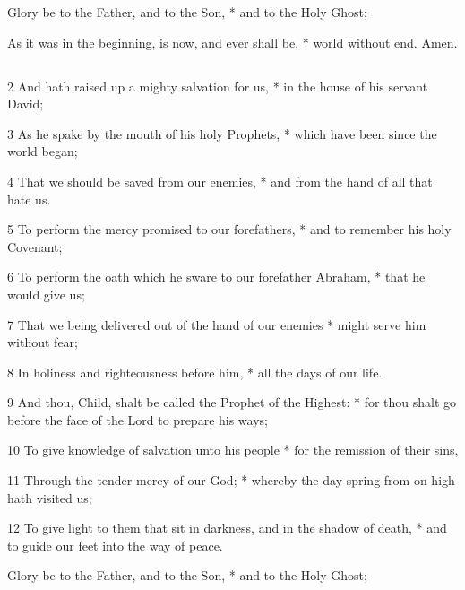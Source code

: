 Glory be to the Father, and to the Son, * and to the Holy Ghost;

As it was in the beginning, is now, and ever shall be, * world without end. Amen.

\subsubsection{}


\subsection{}


2 And hath raised up a mighty salvation for us, * in the house of his servant David;

3 As he spake by the mouth of his holy Prophets, * which have been since the world began;

4 That we should be saved from our enemies, * and from the hand of all that hate us.

5 To perform the mercy promised to our forefathers, * and to remember his holy Covenant;

6 To perform the oath which he sware to our forefather Abraham, * that he would give us;

7 That we being delivered out of the hand of our enemies * might serve him without fear;

8 In holiness and righteousness before him, * all the days of our life.

9 And thou, Child, shalt be called the Prophet of the Highest: * for thou shalt go before the face of the Lord to prepare his ways;

10 To give knowledge of salvation unto his people * for the remission of their sins,

11 Through the tender mercy of our God; * whereby the day-spring from on high hath visited us;

12 To give light to them that sit in darkness, and in the shadow of death, * and to guide our feet into the way of peace.

Glory be to the Father, and to the Son, * and to the Holy Ghost;


